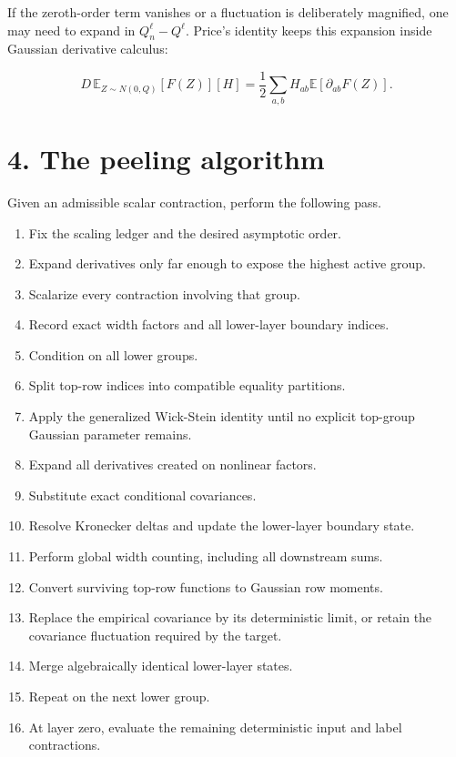 If the zeroth-order term vanishes or a fluctuation is deliberately magnified,
one may need to expand in \(Q_n^\ell-Q^\ell\). Price's identity keeps this
expansion inside Gaussian derivative calculus:

\[
D\,\mathbb E_{Z\sim N(0,Q)}[F(Z)][H]
=
\frac12\sum_{a,b}
H_{ab}\mathbb E[\partial_{ab}F(Z)].
\]


\section*{4. The peeling algorithm}


Given an admissible scalar contraction, perform the following pass.

\begin{enumerate}
\item Fix the scaling ledger and the desired asymptotic order.
\item Expand derivatives only far enough to expose the highest active group.
\item Scalarize every contraction involving that group.
\item Record exact width factors and all lower-layer boundary indices.
\item Condition on all lower groups.
\item Split top-row indices into compatible equality partitions.
\item Apply the generalized Wick-Stein identity until no explicit top-group
   Gaussian parameter remains.
\item Expand all derivatives created on nonlinear factors.
\item Substitute exact conditional covariances.
\item Resolve Kronecker deltas and update the lower-layer boundary state.
\item Perform global width counting, including all downstream sums.
\item Convert surviving top-row functions to Gaussian row moments.
\item Replace the empirical covariance by its deterministic limit, or retain
    the covariance fluctuation required by the target.
\item Merge algebraically identical lower-layer states.
\item Repeat on the next lower group.
\item At layer zero, evaluate the remaining deterministic input and label
    contractions.
\end{enumerate}


